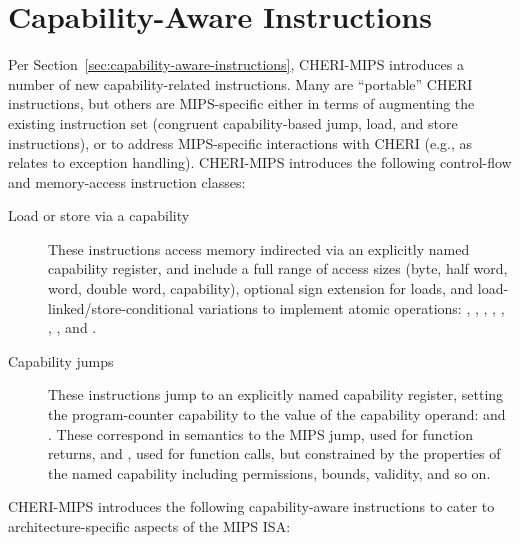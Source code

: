 \section{Capability-Aware Instructions}

Per Section~\ref{sec:capability-aware-instructions}, CHERI-MIPS introduces a
number of new capability-related instructions.
Many are ``portable'' CHERI instructions, but others are MIPS-specific either
in terms of augmenting the existing instruction set (congruent
capability-based jump, load, and store instructions), or to address
MIPS-specific interactions with CHERI (e.g., as relates to exception
handling).
CHERI-MIPS introduces the following control-flow and memory-access instruction
classes:

\begin{description}
\item[Load or store via a capability]
These instructions access memory indirected via an explicitly named capability
register, and include a full range of access sizes (byte, half word, word,
double word, capability), optional sign extension for loads, and
load-linked/store-conditional variations to implement atomic operations:
, ,
, ,
, ,
, and .

\item[Capability jumps]
These instructions jump to an explicitly named capability register, setting
the program-counter capability to the value of the capability operand:
 and .
These correspond in semantics to the MIPS  jump, used for
function returns, and , used for function calls, but
constrained by the properties of the named capability including permissions,
bounds, validity, and so on.
\end{description}

\noindent
CHERI-MIPS introduces the following capability-aware instructions to
cater to architecture-specific aspects of the MIPS ISA:

